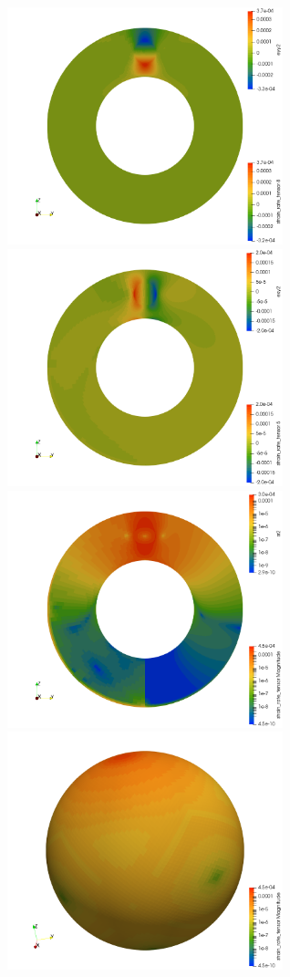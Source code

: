 \begin{center}
\includegraphics[width=8cm]{python_codes/fieldstone_152/results/exp2_axisymmetric/aspect/eyy}
\includegraphics[width=8cm]{python_codes/fieldstone_152/results/exp2_axisymmetric/aspect/exy}\\
\includegraphics[width=8cm]{python_codes/fieldstone_152/results/exp2_axisymmetric/aspect/sr}
\includegraphics[width=8cm]{python_codes/fieldstone_152/results/exp2_axisymmetric/aspect/sr2}\\

\end{center}
